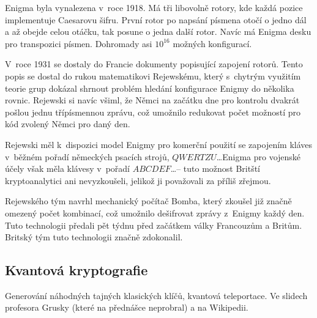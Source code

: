 Enigma byla vynalezena v~roce 1918. Má tři libovolně rotory, kde každá
pozice implementuje Caesarovu šifru. První rotor po napsání písmena
otočí o jedno dál a až obejde celou otáčku, tak posune o jedna další
rotor.  Navíc má Enigma desku pro transpozici písmen. Dohromady asi
$10^{16}$ možných konfigurací.

V~roce 1931 se dostaly do Francie dokumenty popisující zapojení rotorů.
Tento popis se dostal do rukou matematikovi Rejewskému,
který s~chytrým využitím teorie grup dokázal shrnout problém hledání
konfigurace Enigmy do několika rovnic.
Rejewski si navíc všiml, že Němci na začátku dne pro kontrolu dvakrát pošlou jednu
třípísmennou zprávu, což umožnilo redukovat počet možností pro kód
zvolený Němci pro daný den.

Rejewski měl k~dispozici model Enigmy pro komerční použití se zapojením
kláves v~běžném pořadí německých psacích strojů, $QWERTZU$\ldots Enigma
pro vojenské účely však měla klávesy v~pořadí $ABCDEF$\ldots -- tuto
možnost Britští kryptoanalytici ani nevyzkoušeli, jelikož ji považovali
za příliš zřejmou.

Rejewského tým navrhl mechanický počítač Bomba, který zkoušel již značně
omezený počet kombinací, což umožnilo dešifrovat zprávy z~Enigmy každý
den. Tuto technologii předali pět týdnu před začátkem války Francouzům a
Britům. Britský tým tuto technologii značně zdokonalil.

\subsection{Kvantová kryptografie}

Generování náhodných tajných klasických klíčů, kvantová teleportace.
Ve slidech profesora Grusky (které na přednášce neprobral)
a na Wikipedii.
